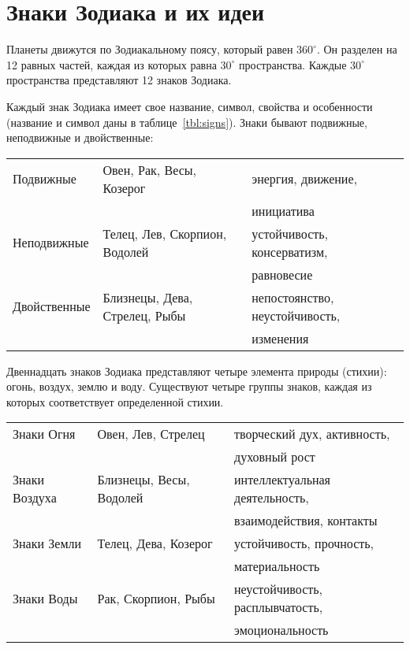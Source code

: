 \section{Знаки Зодиака и их идеи}

Планеты движутся по Зодиакальному поясу, который равен \(360^\circ\). Он разделен на 12 равных частей, каждая из которых равна \(30^\circ\) пространства. Каждые \(30^\circ\) пространства представляют 12 знаков Зодиака.

Каждый знак Зодиака имеет свое название, символ, свойства и особенности (название и символ даны в таблице~\ref{tbl:signs}).
Знаки бывают подвижные, неподвижные и двойственные:

\begin{table}[tph!]
	\renewcommand{\arraystretch}{1}

	\begin{tabular}{l|l|l}
		Подвижные    & Овен, Рак, Весы, Козерог & энергия, движение, \\
		             & & инициатива \\
		Неподвижные  & Телец, Лев, Скорпион, Водолей & устойчивость, консерватизм, \\
		             & & равновесие \\
		Двойственные & Близнецы, Дева, Стрелец, Рыбы & непостоянство, неустойчивость, \\
		             & & изменения \\
	\end{tabular}
\end{table}

Двеннадцать знаков Зодиака представляют четыре элемента природы (стихии): огонь, воздух, землю и воду. Существуют четыре группы знаков, каждая из которых соответствует определенной стихии.

\begin{table}[tph!]
	\renewcommand{\arraystretch}{1}

	\begin{tabular}{l|l|l}
		Знаки Огня    & Овен, Лев, Стрелец & творческий дух, активность, \\
		              & & духовный рост \\
		Знаки Воздуха & Близнецы, Весы, Водолей & интеллектуальная деятельность, \\
		              & & взаимодействия, контакты \\
		Знаки Земли   & Телец, Дева, Козерог & устойчивость, прочность, \\
		              & & материальность \\
		Знаки Воды    & Рак, Скорпион, Рыбы & неустойчивость, расплывчатость, \\
		              & & эмоциональность \\
	\end{tabular}
\end{table}

